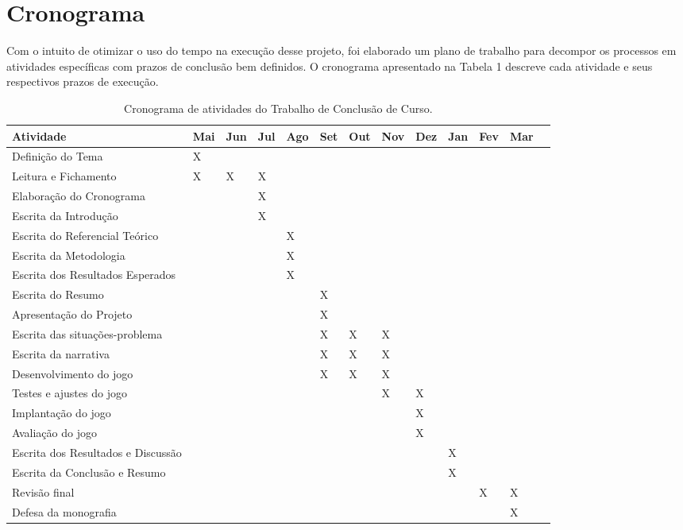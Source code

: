 \chapter{Cronograma}
\label{cronograma}

Com o intuito de otimizar o uso do tempo na execução desse projeto, foi elaborado um plano de trabalho para decompor os processos em atividades específicas com prazos de conclusão bem definidos. O cronograma apresentado na Tabela 1 descreve cada atividade e seus respectivos prazos de execução. 

\begin{table}[!htb]
	\centering %
	\caption{Cronograma de atividades do Trabalho de Conclusão de Curso.}
	\label{extabela}
	\renewcommand{\arraystretch}{1.5}
	\begin{tabularx}{\textwidth}{l*{12}{X}}
		\hline
		Atividade & Mai & Jun & Jul & Ago & Set & Out & Nov & Dez & Jan & Fev & Mar \\
		\hline 
		Definição do Tema & X & &  &  &  &  &  &  &  &  &\\
		\hline 
		Leitura e Fichamento & X & X & X &  &  &  &  &  &  & &\\
		\hline
		Elaboração do Cronograma &  &  & X &  &  &  &  &  &  &  &\\
		\hline 
		Escrita da Introdução &  &  & X &  &  &  &  &  &  & &\\
		\hline
		Escrita do Referencial Teórico &  &  &  & X &  &  &  &  &  & &\\
		\hline
		Escrita da Metodologia &  &  &  & X &  &  &  &  &  & &\\
		\hline
		Escrita dos Resultados Esperados &  &  &  & X &  &  &  &  &  & &\\
		\hline
		Escrita do Resumo &  &  &  &  & X &  &  &  &  & &\\
		\hline
		Apresentação do Projeto &  &  &  &  & X &  &  &  &  & &\\
		\hline
		Escrita das situações-problema &  &  &  &  & X & X & X &  &  & &\\
		\hline
		Escrita da narrativa &  &  &  &  & X & X & X &  &  & &\\
		\hline
		Desenvolvimento do jogo &  &  &  &  & X & X & X &  &  & &\\
		\hline
		Testes e ajustes do jogo &  &  &  &  &  &  & X & X &  & &\\
		\hline
		Implantação do jogo &  &  &  &  &  &  &  & X &  & &\\
		\hline
		Avaliação do jogo &  &  &  &  &  &  &  & X &  & &\\
		\hline
		Escrita dos Resultados e Discussão &  &  &  &  &  &  &  &  & X & &\\
		\hline
		Escrita da Conclusão e Resumo &  &  &  &  &  &  &  &  & X & &\\
		\hline
		Revisão final &  &  &  &  &  &  &  &  & & X & X\\
		\hline
		Defesa da monografia &  &  &  &  &  &  &  &  &  &  & X\\
		\hline
	\end{tabularx}
\end{table}
